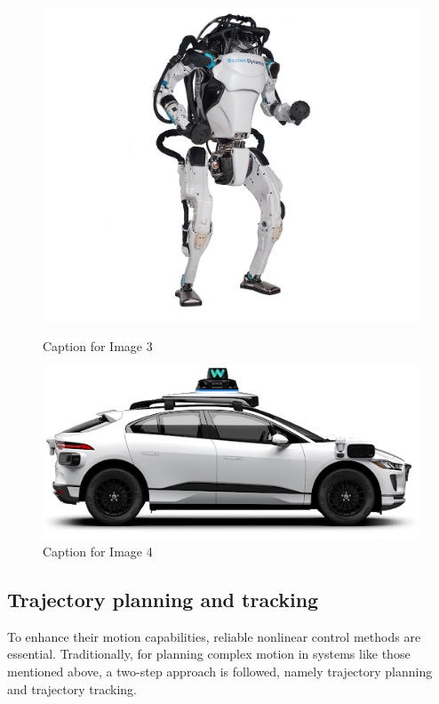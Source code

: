 \begin{figure}[!htbp]
  \vspace{1em} %

  \begin{minipage}[b]{0.40\textwidth}
    \centering
    \includegraphics[width=\textwidth]{figures/humanoid.jpg}
    \caption{Caption for Image 3}
    \label{fig:image3}
  \end{minipage}
  \hfill
  \begin{minipage}[b]{0.40\textwidth}
    \centering
    \includegraphics[width=\textwidth]{figures/waymo.png}
    \caption{Caption for Image 4}
    \label{fig:image4}
  \end{minipage}
\end{figure}

\subsection{Trajectory planning and tracking}
To enhance their motion capabilities, reliable nonlinear control methods are essential. Traditionally, for planning complex motion in systems like those mentioned above, a two-step approach is followed, namely trajectory planning and trajectory tracking.

